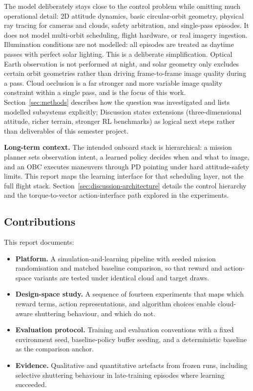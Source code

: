The model deliberately stays close to the control problem while omitting much operational detail: 2D attitude dynamics, basic circular-orbit geometry, physical ray tracing for cameras and clouds, safety arbitration, and single-pass episodes.
It does not model multi-orbit scheduling, flight hardware, or real imagery ingestion.
Illumination conditions are not modelled: all episodes are treated as daytime passes with perfect solar lighting.
This is a deliberate simplification.
Optical Earth observation is not performed at night, and solar geometry only excludes certain orbit geometries rather than driving frame-to-frame image quality during a pass.
Cloud occlusion is a far stronger and more variable image quality constraint within a single pass, and is the focus of this work.
Section~\ref{sec:methods} describes how the question was investigated and lists modelled subsystems explicitly; Discussion states extensions (three-dimensional attitude, richer terrain, stronger RL benchmarks) as logical next steps rather than deliverables of this semester project.

\textbf{Long-term context.}
The intended onboard stack is hierarchical: a mission planner sets observation intent, a learned policy decides when and what to image, and an OBC executes maneuvers through PD pointing under hard attitude-safety limits.
This report maps the learning interface for that scheduling layer, not the full flight stack.
Section~\ref{sec:discussion-architecture} details the control hierarchy and the torque-to-vector action-interface path explored in the experiments.

\subsection{Contributions}
This report documents:
\begin{itemize}
  \item \textbf{Platform.} A simulation-and-learning pipeline with seeded mission randomisation and matched baseline comparison, so that reward and action-space variants are tested under identical cloud and target draws.
  \item \textbf{Design-space study.} A sequence of fourteen experiments that maps which reward terms, action representations, and algorithm choices enable cloud-aware shuttering behaviour, and which do not.
  \item \textbf{Evaluation protocol.} Training and evaluation conventions with a fixed environment seed, baseline-policy buffer seeding, and a deterministic baseline as the comparison anchor.
  \item \textbf{Evidence.} Qualitative and quantitative artefacts from frozen runs, including selective shuttering behaviour in late-training episodes where learning succeeded.
\end{itemize}

